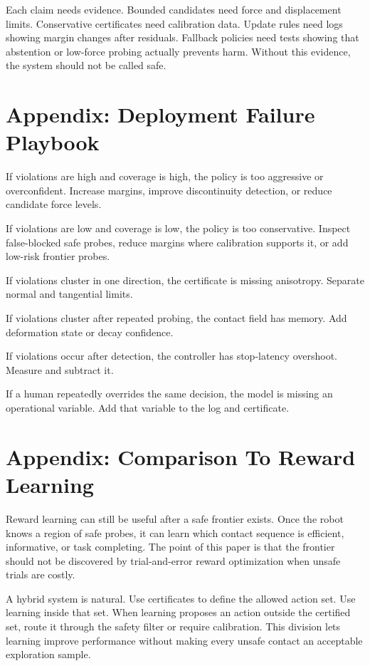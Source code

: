 \documentclass{article}
\begin{document}
Each claim needs evidence. Bounded candidates need force and displacement
limits. Conservative certificates need calibration data. Update rules need logs
showing margin changes after residuals. Fallback policies need tests showing
that abstention or low-force probing actually prevents harm. Without this
evidence, the system should not be called safe.

\section{Appendix: Deployment Failure Playbook}

If violations are high and coverage is high, the policy is too aggressive or
overconfident. Increase margins, improve discontinuity detection, or reduce
candidate force levels.

If violations are low and coverage is low, the policy is too conservative.
Inspect false-blocked safe probes, reduce margins where calibration supports
it, or add low-risk frontier probes.

If violations cluster in one direction, the certificate is missing anisotropy.
Separate normal and tangential limits.

If violations cluster after repeated probing, the contact field has memory.
Add deformation state or decay confidence.

If violations occur after detection, the controller has stop-latency overshoot.
Measure and subtract it.

If a human repeatedly overrides the same decision, the model is missing an
operational variable. Add that variable to the log and certificate.

\section{Appendix: Comparison To Reward Learning}

Reward learning can still be useful after a safe frontier exists. Once the
robot knows a region of safe probes, it can learn which contact sequence is
efficient, informative, or task completing. The point of this paper is that
the frontier should not be discovered by trial-and-error reward optimization
when unsafe trials are costly.

A hybrid system is natural. Use certificates to define the allowed action set.
Use learning inside that set. When learning proposes an action outside the
certified set, route it through the safety filter or require calibration. This
division lets learning improve performance without making every unsafe contact
an acceptable exploration sample.
\end{document}
